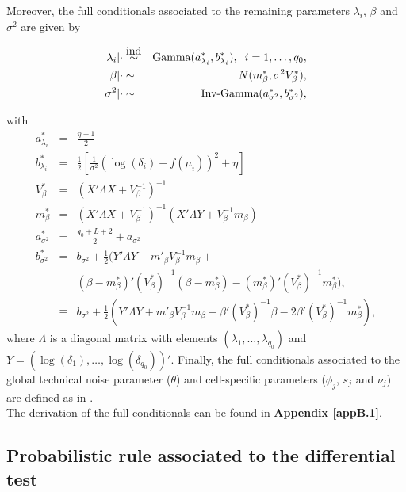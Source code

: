 Moreover, the full conditionals associated to the remaining parameters $\lambda_i$, $\beta$ and $\sigma^2$ are given by 

\begin{eqnarray}
\lambda_i|\cdot & \stackrel{\mbox{ind}}{\sim} & \text{Gamma}(a^*_{\lambda_i},b^*_{\lambda_i}), \hspace{0.2cm} i = 1, \ldots, q_0, \\
\beta|\cdot & \sim & N(m^*_{\beta}, \sigma^2 V^*_{\beta}), \\
\sigma^2|\cdot & \sim & \text{Inv-Gamma}(a^*_{\sigma^2},b^*_{\sigma^2}),
\end{eqnarray} 

with \begin{eqnarray}
a^*_{\lambda_i} & = & \frac{\eta+1}{2} \\
b^*_{\lambda_i} & = & \frac{1}{2}\left[\frac{1}{\sigma^2}(\log(\delta_i)-f(\mu_i))^2+\eta\right] \\
V^*_{\beta} & = & (X' \Lambda X + V_\beta^{-1})^{-1} \\
m^*_{\beta} & = & (X' \Lambda X+V_\beta^{-1})^{-1}(X' \Lambda Y + V_\beta^{-1}m_\beta{}) \\
a^*_{\sigma^2} & = & \frac{q_0+L+2}{2}+a_{\sigma^2}\\
b^*_{\sigma^2} & = & b_{\sigma^2}+\frac{1}{2}(Y'\Lambda Y+ m'_{\beta} V_\beta^{-1} m_\beta+ \nonumber \\
&  &(\beta-m^*_{\beta})' (V^*_{\beta})^{-1} (\beta-m^*_{\beta}) - (m^*_{\beta})' (V^*_{\beta})^{-1} m^*_{\beta}),  \\
& \equiv & b_{\sigma^2}+\frac{1}{2}(Y'\Lambda Y+ m'_{\beta} V_\beta^{-1} m_\beta + \beta' (V^*_{\beta})^{-1} \beta - 2 \beta' (V^*_{\beta})^{-1} m^*_{\beta} ),
\end{eqnarray} where $\Lambda$ is a diagonal matrix with elements $(\lambda_1, \ldots, \lambda_{q_0})$ and $Y = (\log(\delta_1), \ldots, \log(\delta_{q_0}))'$. Finally, the full conditionals associated to the global technical noise parameter ($\theta$) and cell-specific parameters ($\phi_j$, $s_j$ and $\nu_j$) are defined as in \cite{Vallejos2016}.\\

The derivation of the full conditionals can be found in \textbf{Appendix  \ref{appB.1}}.

\newpage


\subsection{Probabilistic rule associated to the differential test} \label{sec:differentialtest}

